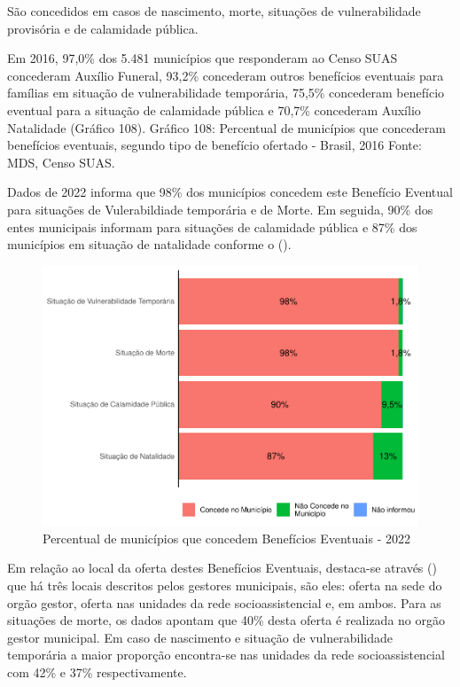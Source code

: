 \documentclass[
  brazilian]{report}
\begin{document}
São concedidos em casos de nascimento, morte, situações de
vulnerabilidade provisória e de calamidade pública.

Em 2016, 97,0\% dos 5.481 municípios que responderam ao Censo SUAS
concederam Auxílio Funeral, 93,2\% concederam outros benefícios
eventuais para famílias em situação de vulnerabilidade temporária,
75,5\% concederam benefício eventual para a situação de calamidade
pública e 70,7\% concederam Auxílio Natalidade (Gráfico 108). Gráfico
108: Percentual de municípios que concederam benefícios eventuais,
segundo tipo de benefício ofertado - Brasil, 2016 Fonte: MDS, Censo
SUAS.

Dados de 2022 informa que 98\% dos municípios concedem este Benefício
Eventual para situações de Vulerabildiade temporária e de Morte. Em
seguida, 90\% dos entes municipais informam para situações de calamidade
pública e 87\% dos municípios em situação de natalidade conforme o
().

\begin{figure}
\includegraphics{Censo-SUAS-2022_files/figure-latex/be-munic-1} \caption[Percentual de municípios que concedem Benefícios Eventuais - 2022]{Percentual de municípios que concedem Benefícios Eventuais - 2022}\label{fig:be-munic}
\end{figure}

Em relação ao local da oferta destes Benefícios Eventuais, destaca-se
através () que há três locais descritos pelos
gestores municipais, são eles: oferta na sede do orgão gestor, oferta
nas unidades da rede socioassistencial e, em ambos. Para as situações de
morte, os dados apontam que 40\% desta oferta é realizada no orgão
gestor municipal. Em caso de nascimento e situação de vulnerabilidade
temporária a maior proporção encontra-se nas unidades da rede
socioassistencial com 42\% e 37\% respectivamente.
\end{document}
